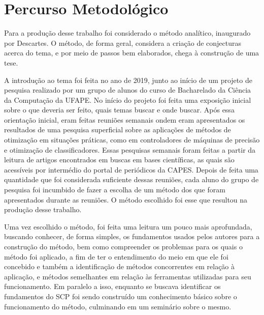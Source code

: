 \chapter{\larger Percurso Metodológico}
\label{chap:metodologia}


Para a produção desse trabalho foi considerado o método analítico, inaugurado por Descartes. O método, de forma geral, considera a criação de conjecturas acerca do tema, e por meio de passos bem elaborados, chega à construção de uma tese.

A introdução ao tema foi feita no ano de 2019, junto ao início de um projeto de pesquisa realizado por um grupo de alunos do curso de Bacharelado da Ciência da Computação da UFAPE. No início do projeto foi feita uma exposição inicial sobre o que deveria ser feito, quais temas buscar e onde buscar. Após essa orientação inicial, eram feitas reuniões semanais ondem eram apresentados os resultados de uma pesquisa superficial sobre as aplicações de métodos de otimização em situações práticas, como em controladores de máquinas de precisão e otimização de classificadores. Essas pesquisas semanais foram feitas a partir da leitura de artigos encontrados em buscas em bases científicas, as quais são acessíveis por intermédio do portal de periódicos da CAPES. Depois de feita uma quantidade que foi considerada suficiente dessas reuniões, cada aluno do grupo de pesquisa foi incumbido de fazer a escolha de um método dos que foram apresentados durante as reuniões. O método escolhido foi esse que resultou na produção desse trabalho.

Uma vez escolhido o método, foi feita uma leitura um pouco mais aprofundada, buscando conhecer, de forma simples, os fundamentos usados pelos autores para a construção do método, bem como compreender os problemas para os quais o método foi aplicado, a fim de ter o entendimento do meio em que ele foi concebido e também a identificação de métodos concorrentes em relação à aplicação, e métodos semelhantes em relação às ferramentas utilizadas para seu funcionamento. Em paralelo a isso, enquanto se buscava identificar os fundamentos do SCP foi sendo construído um conhecimento básico sobre o funcionamento do método, culminando em um seminário sobre o mesmo.

